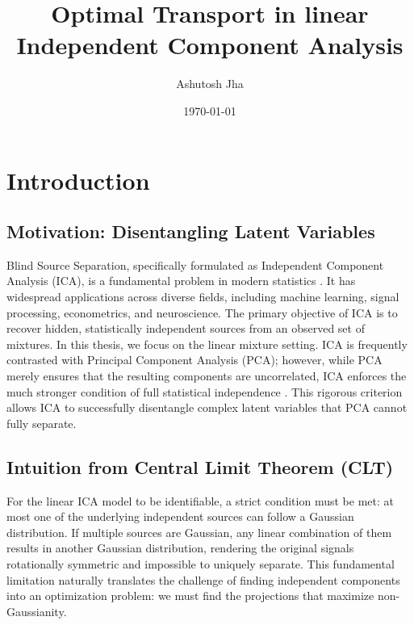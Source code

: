 \documentclass[12pt,a4paper,twoside,openany]{book}
\title{Optimal Transport in linear Independent Component Analysis}
\author{Ashutosh Jha}
\date{\today} %
\begin{document}
\maketitle

\clearpage
\listoffigures
\clearpage
\listoftables
\cleardoublepage

\chapter{Introduction}

\section{Motivation: Disentangling Latent Variables}
Blind Source Separation, specifically formulated as Independent Component Analysis (ICA), is a fundamental problem in modern statistics \cite{jutten1985}. 
It has widespread applications across diverse fields, including machine learning, signal processing, econometrics, and neuroscience. 
The primary objective of ICA is to recover hidden, statistically independent sources from an observed set of mixtures. 
In this thesis, we focus on the linear mixture setting. ICA is frequently contrasted with Principal Component Analysis (PCA); 
however, while PCA merely ensures that the resulting components are uncorrelated, ICA enforces the much stronger condition of full statistical independence \cite[Chapter 1]{hyvarinen2001}. 
This rigorous criterion allows ICA to successfully disentangle complex latent variables that PCA cannot fully separate.

\section{Intuition from Central Limit Theorem (CLT)}
For the linear ICA model to be identifiable, a strict condition must be met: at most one of the underlying independent sources can follow a Gaussian distribution. 
If multiple sources are Gaussian, any linear combination of them results in another Gaussian distribution, 
rendering the original signals rotationally symmetric and impossible to uniquely separate. 
This fundamental limitation naturally translates the challenge of finding independent components into an optimization problem: we must find the projections that maximize non-Gaussianity.
\end{document}
